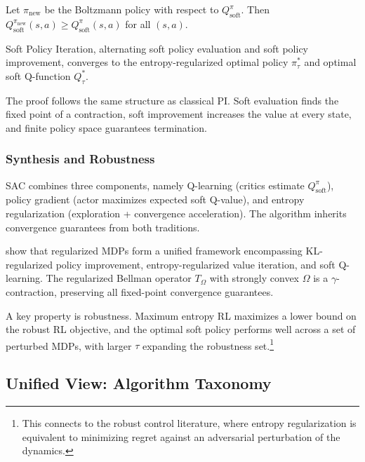 \begin{lemma}
\label{lem:soft_improve}
Let $\pi_{\text{new}}$ be the Boltzmann policy with respect to $Q^\pi_{\text{soft}}$. Then $Q^{\pi_{\text{new}}}_{\text{soft}}(s,a) \geq Q^\pi_{\text{soft}}(s,a)$ for all $(s,a)$.
\end{lemma}

\begin{theorem}
\label{thm:soft_pi}
Soft Policy Iteration, alternating soft policy evaluation and soft policy improvement, converges to the entropy-regularized optimal policy $\pi^*_\tau$ and optimal soft Q-function $Q^*_\tau$.
\end{theorem}

The proof follows the same structure as classical PI. Soft evaluation finds the fixed point of a contraction, soft improvement increases the value at every state, and finite policy space guarantees termination.


\subsubsection{Synthesis and Robustness}

SAC combines three components, namely Q-learning (critics estimate $Q^\pi_{\text{soft}}$), policy gradient (actor maximizes expected soft Q-value), and entropy regularization (exploration + convergence acceleration). The algorithm inherits convergence guarantees from both traditions.

\citet{geist2019regularized} show that regularized MDPs form a unified framework encompassing KL-regularized policy improvement, entropy-regularized value iteration, and soft Q-learning. The regularized Bellman operator $T_\Omega$ with strongly convex $\Omega$ is a $\gamma$-contraction, preserving all fixed-point convergence guarantees.

A key property is robustness. Maximum entropy RL maximizes a lower bound on the robust RL objective, and the optimal soft policy performs well across a set of perturbed MDPs, with larger $\tau$ expanding the robustness set.\footnote{This connects to the robust control literature, where entropy regularization is equivalent to minimizing regret against an adversarial perturbation of the dynamics.}


\subsection{Unified View: Algorithm Taxonomy}
\label{sec:taxonomy}


